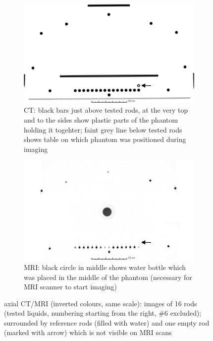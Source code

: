 \documentclass[parskip,bibtotoc,final,twoside=false,titlepage,a4paper,english,12pt,titlepage,a4paper]{scrbook}
\begin{document}
\begin{figure}[!tbp]
  \begin{subfigure}[b]{\textwidth}
    \includegraphics[width=\textwidth]{slicer3D/full_phantom/axial_CT_rods-arrow.png}
    \caption{CT: black bars just above tested rods, at the very top and to the sides show plastic parts of the phantom holding it togehter; faint grey line below tested rods shows table on which phantom was positioned during imaging}
    \label{fig:axial_CT_rods}
  \end{subfigure}
  \begin{subfigure}[b]{\textwidth}
    \includegraphics[width=\textwidth]{slicer3D/full_phantom/axial_MR-arrow.png}
    \caption{MRI: black circle in middle shows water bottle which was placed in the middle of the phantom (necessary for MRI scanner to start imaging)}
    \label{fig:axial_MR}
  \end{subfigure}
  \caption{axial CT/MRI (inverted colours, same scale): images of 16 rods (tested liquids, numbering starting from the right, \#6 excluded); surrounded by reference rods (filled with water) and one empty rod (marked with arrow) which is not visible on MRI scans}
  \label{fig:axial}
\end{figure}
\end{document}

